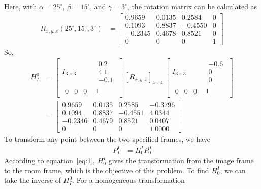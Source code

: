 \documentclass[12pt, a4paper]{article}
\begin{document}
Here, with \(\alpha = 25^\circ\), \(\beta = 15^\circ\), and \(\gamma = 3^\circ\), the rotation matrix can be calculated as
\begin{align}
	R_{x, y, x}(25^\circ, 15^\circ, 3^\circ) & = \begin{bmatrix}
		                                             0.9659  & 0.0135 & 0.2584  & 0 \\
		                                             0.1093  & 0.8837 & -0.4550 & 0 \\
		                                             -0.2345 & 0.4678 & 0.8521  & 0 \\
		                                             0       & 0      & 0       & 1
	                                             \end{bmatrix}
\end{align}
So,
\begin{align}
	H_I^0 & =
	\begin{bmatrix}
		I_{3\times3}                          & \begin{matrix} 0.2 \\ 4.1 \\ -0.1 \end{matrix} \\
		\begin{matrix} 0 & 0 & 0 \end{matrix} & 1
	\end{bmatrix}
	\, [R_{x, y, x}]_{4\times4} \,
	\begin{bmatrix}
		I_{3\times3}                          & \begin{matrix} -0.6 \\ 0 \\ 0 \end{matrix} \\
		\begin{matrix} 0 & 0 & 0 \end{matrix} & 1
	\end{bmatrix} \nonumber \\
	      & = \begin{bmatrix}
				0.9659 & 0.0135 & 0.2585 & -0.3796 \\
				0.1094 & 0.8837 & -0.4551 & 4.0344 \\
				-0.2346 & 0.4679 & 0.8521 & 0.0407 \\
				0 & 0 & 0 & 1.0000
	          \end{bmatrix}
\end{align}
To transform any point between the two specified frames, we have
\begin{align}
	P_I^I & = H_0^I P_0^0 \label{eq:1}
\end{align}
According to equation~\ref{eq:1}, \(H_0^I\) gives the transformation from the image frame to the room frame, which is the objective of this problem. To find \(H_0^I\), we can take the inverse of \(H_I^0\). For a homogeneous transformation
\end{document}
